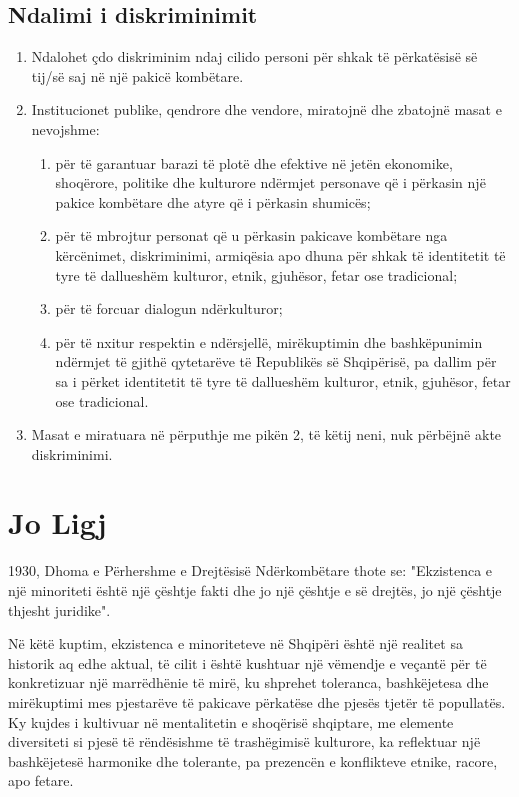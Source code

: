 \documentclass[a4paper]{article}
\begin{document}
\subsection*{Ndalimi i diskriminimit}
\begin{enumerate}
	\item  Ndalohet  çdo  diskriminim  ndaj  cilido  personi  për  shkak  të  përkatësisë  së  tij/së saj  në një pakicë kombëtare. 
	\item Institucionet   publike,   qendrore   dhe   vendore,    miratojnë dhe   zbatojnë   masat   e   nevojshme:
	\begin{enumerate}
		\item për të garantuar barazi të plotë dhe efektive në jetën ekonomike, shoqërore, politike dhe kulturore  ndërmjet  personave  që  i  përkasin  një  pakice  kombëtare  dhe  atyre  që  i  përkasin  shumicës;
		\item për   të   mbrojtur   personat   që   u   përkasin   pakicave   kombëtare   nga   kërcënimet,   diskriminimi, armiqësia  apo  dhuna  për  shkak  të  identitetit  të  tyre  të  dallueshëm  kulturor, etnik, gjuhësor, fetar ose tradicional;
		\item për të forcuar dialogun ndërkulturor;
		\item për të nxitur respektin e ndërsjellë, mirëkuptimin dhe bashkëpunimin ndërmjet të gjithë qytetarëve  të  Republikës  së  Shqipërisë,  pa  dallim  për  sa  i  përket identitetit  të  tyre  të  dallueshëm kulturor, etnik, gjuhësor, fetar ose tradicional.
	\end{enumerate}
\item Masat  e  miratuara  në  përputhje  me  pikën 2,    të  këtij  neni, nuk  përbëjnë  akte  diskriminimi.
\end{enumerate}
\section*{Jo Ligj}
1930, Dhoma e Përhershme e Drejtësisë Ndërkombëtare thote se: "Ekzistenca e një minoriteti është një  çështje fakti dhe jo një çështje e së drejtës, jo një çështje thjesht juridike". 

Në këtë kuptim, ekzistenca e minoriteteve në Shqipëri është një realitet  sa historik aq edhe aktual, të cilit i është kushtuar një vëmendje e veçantë për  të konkretizuar një marrëdhënie të mirë, ku shprehet toleranca, bashkëjetesa  dhe mirëkuptimi mes pjestarëve të pakicave përkatëse dhe pjesës tjetër të  popullatës. Ky kujdes i kultivuar në mentalitetin e shoqërisë shqiptare, me  elemente diversiteti si pjesë të rëndësishme të trashëgimisë kulturore, ka  reflektuar një bashkëjetesë harmonike dhe tolerante, pa prezencën e  konflikteve etnike, racore, apo fetare. 
\end{document}
